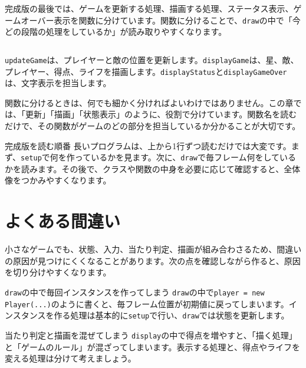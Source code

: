 完成版の最後では、ゲームを更新する処理、描画する処理、ステータス表示、ゲームオーバー表示を関数に分けています。関数に分けることで、\texttt{draw}の中で「今どの段階の処理をしているか」が読み取りやすくなります。

\begin{listing}[htbp]
\inputminted[firstline=190,lastline=237]{ts}{typescript-p5/listings/chapter15/star-catcher-game.ts}
\caption{更新、描画、表示を関数に分ける（\texttt{chapter15/star-catcher-game.ts}）}
\label{lst:chapter15-helper-functions}
\end{listing}

\texttt{updateGame}は、プレイヤーと敵の位置を更新します。\texttt{displayGame}は、星、敵、プレイヤー、得点、ライフを描画します。\texttt{displayStatus}と\texttt{displayGameOver}は、文字表示を担当します。

関数に分けるときは、何でも細かく分ければよいわけではありません。この章では、「更新」「描画」「状態表示」のように、役割で分けています。関数名を読むだけで、その関数がゲームのどの部分を担当しているか分かることが大切です。

\begin{pointbox}{完成版を読む順番}
長いプログラムは、上から1行ずつ読むだけでは大変です。まず、\texttt{setup}で何を作っているかを見ます。次に、\texttt{draw}で毎フレーム何をしているかを読みます。その後で、クラスや関数の中身を必要に応じて確認すると、全体像をつかみやすくなります。
\end{pointbox}

\section{よくある間違い}

小さなゲームでも、状態、入力、当たり判定、描画が組み合わさるため、間違いの原因が見つけにくくなることがあります。次の点を確認しながら作ると、原因を切り分けやすくなります。

\begin{mistakebox}{\texttt{draw}の中で毎回インスタンスを作ってしまう}
\texttt{draw}の中で\texttt{player = new Player(...)}のように書くと、毎フレーム位置が初期値に戻ってしまいます。インスタンスを作る処理は基本的に\texttt{setup}で行い、\texttt{draw}では状態を更新します。
\end{mistakebox}

\begin{mistakebox}{当たり判定と描画を混ぜてしまう}
\texttt{display}の中で得点を増やすと、「描く処理」と「ゲームのルール」が混ざってしまいます。表示する処理と、得点やライフを変える処理は分けて考えましょう。
\end{mistakebox}


